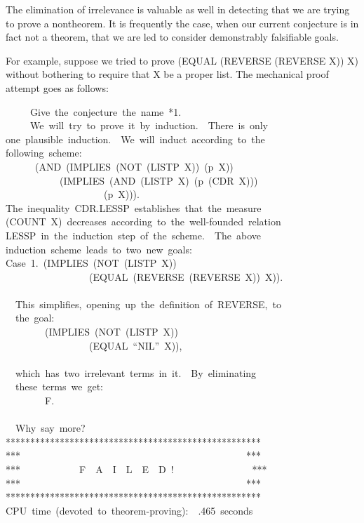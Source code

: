 \documentclass[11pt]{book}
\newenvironment{pubasis}{\begin{flushleft}\ttfamily\small}{\normalsize\rmfamily\end{flushleft}}
\begin{document}
The elimination of irrelevance is valuable as well in
detecting that we are trying to prove a nontheorem.
It is frequently the case, when our current conjecture is in fact
not a theorem, that we are led to consider demonstrably falsifiable
goals.

For example, suppose we tried to prove (EQUAL (REVERSE (REVERSE X)) X)
without bothering to require that X be a proper list.
The mechanical proof attempt goes as follows:
\begin{pubasis}
~~~~~Give~the~conjecture~the~name~*1.\\

~~~~~We~will~try~to~prove~it~by~induction.~~There~is~only\\
one~plausible~induction.~~We~will~induct~according~to~the\\
following~scheme:\\
~~~~~~(AND~(IMPLIES~(NOT~(LISTP~X))~(p~X))\\
~~~~~~~~~~~(IMPLIES~(AND~(LISTP~X)~(p~(CDR~X)))\\
~~~~~~~~~~~~~~~~~~~~(p~X))).\\
The~inequality~CDR.LESSP~establishes~that~the~measure\\
(COUNT~X)~decreases~according~to~the~well-founded~relation\\
LESSP~in~the~induction~step~of~the~scheme.~~The~above\\
induction~scheme~leads~to~two~new~goals:\\

Case~1.~(IMPLIES~(NOT~(LISTP~X))\\
~~~~~~~~~~~~~~~~~(EQUAL~(REVERSE~(REVERSE~X))~X)).\\
~~\\
~~This~simplifies,~opening~up~the~definition~of~REVERSE,~to\\
~~the~goal:\\

~~~~~~~~(IMPLIES~(NOT~(LISTP~X))\\
~~~~~~~~~~~~~~~~~(EQUAL~``NIL''~X)),\\
~~\\
~~which~has~two~irrelevant~terms~in~it.~~By~eliminating\\
~~these~terms~we~get:\\

~~~~~~~~F.\\
~~\\
~~Why~say~more?\\

****************************************************\\
***~~~~~~~~~~~~~~~~~~~~~~~~~~~~~~~~~~~~~~~~~~~~~~***\\
***~~~~~~~~~~~~F~~A~~I~~L~~E~~D~!~~~~~~~~~~~~~~~~***\\
***~~~~~~~~~~~~~~~~~~~~~~~~~~~~~~~~~~~~~~~~~~~~~~***\\
****************************************************\\

CPU~time~(devoted~to~theorem-proving):~~.465~seconds\\
\end{pubasis}
\end{document}

